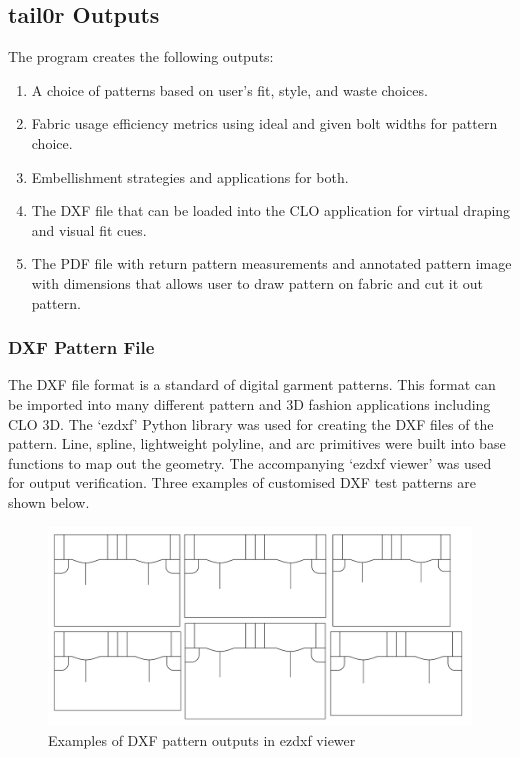 
\subsection{tail0r Outputs}
The program creates the following outputs:
\begin{enumerate}
    \item A choice of patterns based on user's fit, style, and waste choices.
    \item Fabric usage efficiency metrics using ideal and given bolt widths for pattern choice.
    \item Embellishment strategies and applications for both.
    \item The DXF file that can be loaded into the CLO application for virtual draping and visual fit cues.
    \item The PDF file with return pattern measurements and annotated pattern image with dimensions that allows user to draw pattern on fabric and cut it out pattern.
\end{enumerate}

\subsubsection{DXF Pattern File}
The DXF file format is a standard of digital garment patterns. This format can be imported into many different pattern and 3D fashion applications including CLO 3D. The ‘ezdxf’ Python library was used for creating the DXF files of the pattern. Line, spline, lightweight polyline, and arc primitives were built into base functions to map out the geometry. The accompanying ‘ezdxf viewer’ was used for output verification. Three examples of customised DXF test patterns are shown below.

\begin{figure} [H] %
    \centering %
    \includegraphics[width = \textwidth]{Images/example dxfs.png} %
    \caption{Examples of DXF pattern outputs in ezdxf viewer}
\end{figure}


